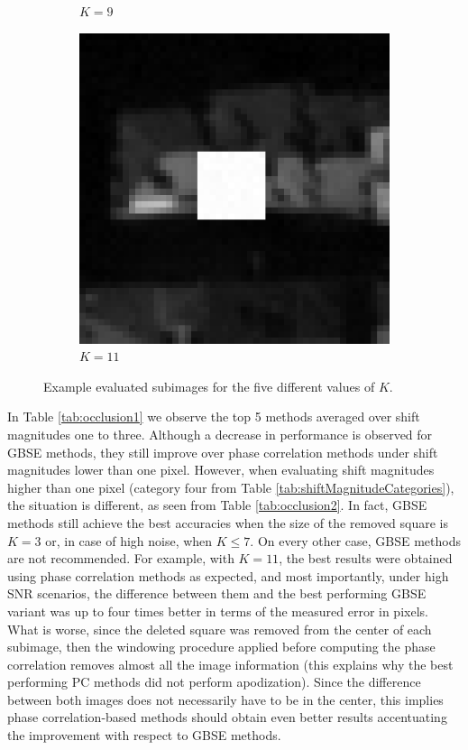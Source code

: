 \begin{figure}[H]
\begin{subfigure}{.15\linewidth}
		\caption{{$K=9$}}
	\end{subfigure}
	\begin{subfigure}{.15\linewidth}
		\includegraphics[width=1\textwidth]{img/testOcclusion5}
		\caption{$K=11$}
	\end{subfigure}%
	\caption{Example evaluated subimages for the five different values of $K$.}
	\label{fig:occlusion}
\end{figure}

In Table \ref{tab:occlusion1} we observe the top 5 methods averaged over shift magnitudes one to three. Although a decrease in performance is observed for GBSE methods, they still improve over phase correlation methods under shift magnitudes lower than one pixel. However, when evaluating shift magnitudes higher than one pixel (category four from Table \ref{tab:shiftMagnitudeCategories}), the situation is different, as seen from Table \ref{tab:occlusion2}. In fact, GBSE methods still achieve the best accuracies when the size of the removed square is $K=3$ or, in case of high noise, when $K \leq 7$. On every other case, GBSE methods are not recommended. For example, with $K=11$, the best results were obtained using phase correlation methods as expected, and most importantly, under high SNR scenarios, the difference between them and the best performing GBSE variant was up to four times better in terms of the measured error in pixels. What is worse, since the deleted square was removed from the center of each subimage, then the windowing procedure applied before computing the phase correlation removes almost all the image information (this explains why the best performing PC methods did not perform apodization). Since the difference between both images does not necessarily have to be in the center, this implies phase correlation-based methods should obtain even better results accentuating the improvement with respect to GBSE methods. 


